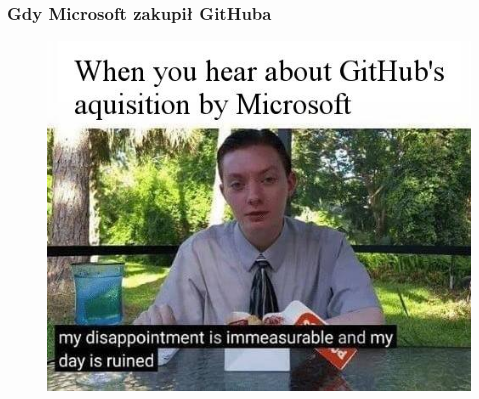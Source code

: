 \documentclass[10pt,t]{beamer}
\begin{document}
\begin{frame}
  \frametitle{Gdy Microsoft zakupił GitHuba}


  \begin{figure}

    \centering


    \includegraphics[scale=0.5]
    {./PresentationsPictures/Microsoft-buying-GitHub.jpg}

  \end{figure}

\end{frame}
\end{document}
